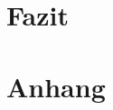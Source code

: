 \documentclass[12pt,a4paper]{article}
\begin{document}
    \section{Fazit}
    \label{sec:fazit}
    
    \newpage


    
    
    \newpage

    
    \section*{Anhang}
    \appendix
    
    
    
    
\end{document}
